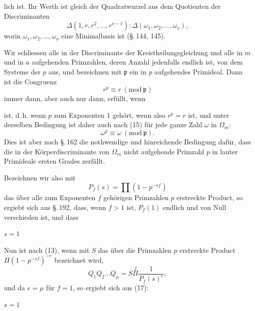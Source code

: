 lich ist. Ihr Werth ist gleich der Quadratwurzel aus dem
Quotienten der Discriminanten
\[
\Delta (1, r, r^2, \ldots, r^{\nu-1}) : \Delta (\omega_1, \omega_2, \ldots, \omega_\nu),
\]
worin $\omega_1, \omega_2, \ldots, \omega_\nu$ eine Minimalbasis ist (\S.\,144, 145).

Wir schliessen alle in der Discriminante der Kreistheilungs\-gleichung und alle in $m$ und in $a$ aufgehenden Primzahlen, deren Anzahl jedenfalls endlich ist, von dem Systeme der $p$ aus, und bezeichnen mit $\mathfrak{p}$ ein in $p$ aufgehendes Primideal. Dann ist die Congruenz
\[
r^p \equiv r \ (\mathrm{mod}\ \mathfrak{p})
\]
immer dann, aber auch nur dann, erfüllt, wenn


ist, d.\,h. wenn $p$ zum Exponenten 1 gehört, wenn also $r^p = r$ ist, und unter derselben Bedingung ist daher auch nach (15) für jede ganze Zahl $\omega$ in $\Omega_m$:
\[
\omega^p \equiv \omega \ (\mathrm{mod}\ \mathfrak{p}).
\]
Dies ist aber nach \S.\,162 die nothwendige und hinreichende Bedingung dafür, dass die in der Körperdiscriminante von $\Omega_m$ nicht aufgehende Primzahl $p$ in lauter Primideale ersten Grades zerfällt.

Bezeichnen wir also mit
\[
P_f(s) = \prod (1 - p^{-sf})
\]
das über alle zum Exponenten $f$ gehörigen Primzahlen $p$ erstreckte Product, so ergiebt sich aus \S.\,192, dass, wenn $f>1$ ist, $P_f(1)$ endlich und von Null verschieden ist, und dass


 $s=1$ 

Nun ist nach (13), wenn mit $S$ das über die  Primzahlen $p$ erstreckte  Product $\Pi(1-p^{-sf})^{-e}$ bezeichnet wird,
\[
Q_1 Q_2 \ldots Q_\mu = S \overset{f}{\Pi} \frac{1}{P_f(s)^{e}},
\]
und da $e = \mu$ für $f = 1$, so ergiebt sich aus (17):


 $s = 1$ 
